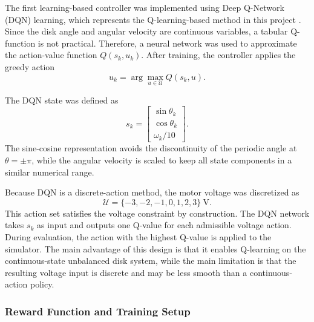 The first learning-based controller was implemented using Deep Q-Network (DQN)
learning, which represents the Q-learning-based method in this project
\cite{watkins1992qlearning,mnih2015dqn}. Since
the disk angle and angular velocity are continuous variables, a tabular
Q-function is not practical. Therefore, a neural network was used to approximate
the action-value function \(Q(s_k,u_k)\). After training, the controller applies
the greedy action
\begin{equation}
    u_k = \arg\max_{u \in \mathcal{U}} Q(s_k,u).
\label{eq:dqn_greedy_action}
\end{equation}

The DQN state was defined as
\begin{equation}
    s_k =
    \begin{bmatrix}
        \sin\theta_k \\
        \cos\theta_k \\
        \omega_k/10
    \end{bmatrix}.
\label{eq:dqn_state}
\end{equation}
The sine-cosine representation avoids the discontinuity of the periodic angle
at \(\theta=\pm\pi\), while the angular velocity is scaled to keep all state
components in a similar numerical range.

Because DQN is a discrete-action method, the motor voltage was discretized as
\begin{equation}
    \mathcal{U} =
    \{-3,-2,-1,0,1,2,3\}~\mathrm{V}.
\label{eq:dqn_action_set}
\end{equation}
This action set satisfies the voltage constraint by construction. The DQN
network takes \(s_k\) as input and outputs one Q-value for each admissible
voltage action. During evaluation, the action with the highest Q-value is
applied to the simulator. The main advantage of this design is that it enables
Q-learning on the continuous-state unbalanced disk system, while the main
limitation is that the resulting voltage input is discrete and may be less
smooth than a continuous-action policy.


\subsubsection{Reward Function and Training Setup}

